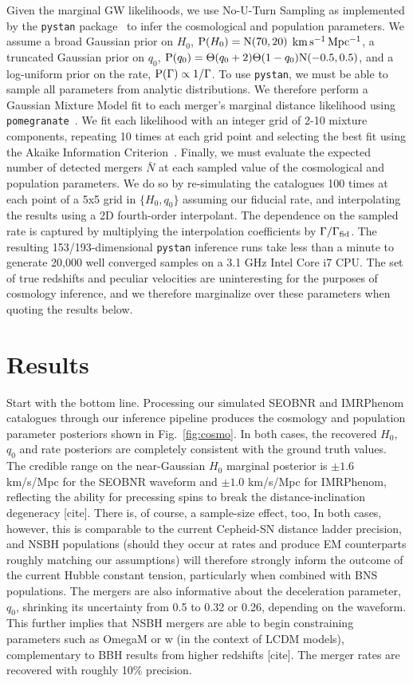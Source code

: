 \documentclass[twocolumn]{aastex63}
\newcommand{\hubble}{\ensuremath{H_0}}
\newcommand{\decel}{\ensuremath{q_0}}
\newcommand{\prob}{\ensuremath{{\rm P}}}
\newcommand{\normal}{{\rm{N}}}
\newcommand{\nexp}{\bar{N}}
\newcommand{\rate}{\Gamma}
\newcommand{\step}{\Theta}
\newcommand{\kmsmpc}{\ensuremath{{\rm km\,s^{-1}\,Mpc^{-1}}}}
\begin{document}
Given the marginal GW likelihoods, we use No-U-Turn Sampling as implemented by the \texttt{pystan} package~\citep{pystan} to infer the cosmological and population parameters. We assume a broad Gaussian prior on \hubble, $\prob(\hubble)=\normal(70,20)$ \kmsmpc, a truncated Gaussian prior on \decel, $\prob(\decel)=\step(\decel+2)\step(1-\decel)\normal(-0.5,0.5)$, and a log-uniform prior on the rate, $\prob(\rate) \propto 1/\rate$. To use \texttt{pystan}, we must be able to sample all parameters from analytic distributions. We therefore perform a Gaussian Mixture Model fit to each merger's marginal distance likelihood using \texttt{pomegranate}~\citep{Schreiber:2017}. We fit each likelihood with an integer grid of 2-10 mixture components, repeating 10 times at each grid point and selecting the best fit using the Akaike Information Criterion~\citep{Akaike:1974}. Finally, we must evaluate the expected number of detected mergers $\nexp$ at each sampled value of the cosmological and population parameters. We do so by re-simulating the catalogues 100 times at each point of a 5x5 grid in $\{H_0,q_0\}$ assuming our fiducial rate, and interpolating the results using a 2D fourth-order interpolant. The dependence on the sampled rate is captured by multiplying the interpolation coefficients by $\Gamma/\Gamma_{\rm fid}$. The resulting 153/193-dimensional \texttt{pystan} inference runs take less than a minute to generate 20,000 well converged samples on a 3.1 GHz Intel Core i7 CPU. The set of true redshifts and peculiar velocities are uninteresting for the purposes of cosmology inference, and we therefore marginalize over these parameters when quoting the results below.

\section{Results} \label{sec:results}

Start with the bottom line. Processing our simulated SEOBNR and IMRPhenom catalogues through our inference pipeline produces the cosmology and population parameter posteriors shown in Fig.~\ref{fig:cosmo}. In both cases, the recovered $H_0$, $q_0$ and rate posteriors are completely consistent with the ground truth values. The credible range on the near-Gaussian $H_0$ marginal posterior is $\pm 1.6$ km/s/Mpc for the SEOBNR waveform and $\pm 1.0$ km/s/Mpc for IMRPhenom, reflecting the ability for precessing spins to break the distance-inclination degeneracy [cite]. There is, of course, a sample-size effect, too,  In both cases, however, this is comparable to the current Cepheid-SN distance ladder precision, and NSBH populations (should they occur at rates and produce EM counterparts roughly matching our assumptions) will therefore strongly inform the outcome of the current Hubble constant tension, particularly when combined with BNS populations. The mergers are also informative about the deceleration parameter, $q_0$, shrinking its uncertainty from 0.5 to 0.32 or 0.26, depending on the waveform. This further implies that NSBH mergers are able to begin constraining parameters such as OmegaM or w (in the context of LCDM models), complementary to BBH results from higher redshifts [cite]. The merger rates are recovered with roughly 10\% precision.
\end{document}

